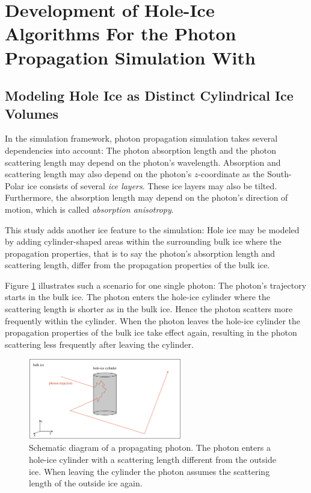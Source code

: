 
\section{Development of Hole-Ice Algorithms For the Photon Propagation Simulation With \clsim}
\label{sec:methods}

\subsection{Modeling Hole Ice as Distinct Cylindrical Ice Volumes}

In the \icecube simulation framework, photon propagation simulation takes several dependencies into account: The photon absorption length and the photon scattering length may depend on the photon's wavelength. Absorption and scattering length may also depend on the photon's $z$-coordinate as the South-Polar ice consists of several \textit{ice layers}. These ice layers may also be tilted. Furthermore, the absorption length may depend on the photon's direction of motion, which is called \textit{absorption anisotropy}.

This study adds another ice feature to the simulation: Hole ice may be modeled by adding cylinder-shaped areas within the surrounding bulk ice where the propagation properties, that is to say the photon's absorption length and scattering length, differ from the propagation properties of the bulk ice.

Figure \ref{fig:aiw2Thah} illustrates such a scenario for one single photon: The photon's trajectory starts in the bulk ice. The photon enters the hole-ice cylinder where the scattering length is shorter as in the bulk ice. Hence the photon scatters more frequently within the cylinder. When the photon leaves the hole-ice cylinder the propagation properties of the bulk ice take effect again, resulting in the photon scattering less frequently after leaving the cylinder.

\begin{figure}[htb]
  \centering
  \includegraphics[width=0.6\textwidth]{img/hole-ice-as-cylinder-shaped-areas}
  \caption{Schematic diagram of a propagating photon. The photon enters a hole-ice cylinder with a scattering length different from the outside ice. When leaving the cylinder the photon assumes the scattering length of the outside ice again.}
  \label{fig:aiw2Thah}
\end{figure}

